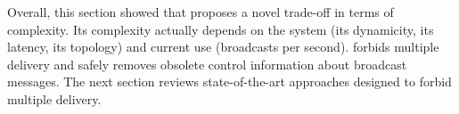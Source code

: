 Overall, this section showed that \RPCBROADCAST proposes a novel trade-off in
terms of complexity. Its complexity actually depends on the system (its
dynamicity, its latency, its topology) and current use (broadcasts per second).
\RPCBROADCAST forbids multiple delivery and safely removes obsolete control
information about broadcast messages. The next section reviews state-of-the-art
approaches designed to forbid multiple delivery.


